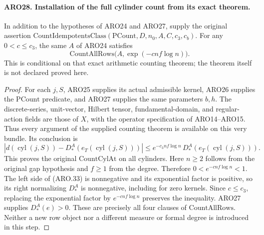 \paragraph{ARO28. Installation of the full cylinder count from its exact theorem.}
\label{claim:ARO28}
In addition to the hypotheses of ARO24 and ARO27, supply the
original assertion
\(\mathrm{CountIdempotentsClass}(\mathrm{PCount},D,n_0,A,C,c_3,c_b)\).
For any \(0<c\leq c_3\), the same \(A\) of ARO24 satisfies
\[
        \mathrm{CountAllRows}\bigl(A,\exp(-cnf\log n)\bigr).
 \tag{ARO.32}
\]
This is conditional on that exact arithmetic counting theorem;
the theorem itself is not declared proved here.
\begin{proof}
For each \(j,S\), ARO25 supplies its actual admissible kernel,
ARO26 supplies the \(\mathrm{PCount}\) predicate, and ARO27
supplies the same parameters \(b,h\).  The discrete-series,
unit-vector, Hilbert tensor, fundamental-domain, and regular-action
fields are those of \(X\), with the operator specification of
ARO14--ARO15.  Thus every argument of the supplied counting
theorem is available on this very bundle.  Its conclusion is
\[
 \left|d(\operatorname{cyl}(j,S))-
                D_*^A(e_T(\operatorname{cyl}(j,S)))\right|
 \leq e^{-c_3nf\log n}\,
                D_*^A(e_T(\operatorname{cyl}(j,S))).   \tag{ARO.33}
\]
This proves the original \(\mathrm{CountCylAt}\) on all cylinders.
Here \(n\geq2\) follows from the original gap hypothesis and
\(f\geq1\) from the degree.  Therefore
\(0<e^{-cnf\log n}<1\).  The left side of (ARO.33) is
nonnegative and its exponential factor is positive, so its right
normalizing \(D_*^A\) is nonnegative, including for zero kernels.
Since \(c\leq c_3\), replacing the exponential factor by
\(e^{-cnf\log n}\) preserves the inequality.  ARO27 supplies
\(D_*^A(e)>0\).  These are precisely all four clauses of
\(\mathrm{CountAllRows}\).  Neither a new row object nor a
different measure or formal degree is introduced in this step.
\end{proof}

